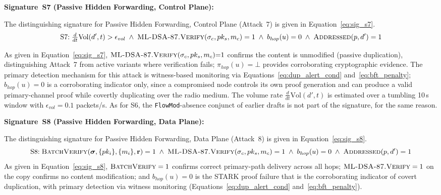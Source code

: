 \documentclass[12pt, a4paper]{report}
\begin{document}

\textbf{Signature~S7 (Passive Hidden Forwarding, Control Plane):}

The distinguishing signature for Passive Hidden
Forwarding, Control Plane (Attack~7) is given in
Equation~\eqref{eq:sig_s7}.
\begin{equation}
\text{S7:}\;
\tfrac{d}{dt}\text{Vol}(d',t) > \epsilon_{vol}
\;\land\; \textsc{ML-DSA-87.Verify}(
\sigma_c, pk_s, m_c) = 1
\;\land\; b_{hop}(u) = 0
\;\land\; \textsc{Addressed}(p, d') = 1
\label{eq:sig_s7}
\end{equation}

As given in Equation~\eqref{eq:sig_s7},
$\textsc{ML-DSA-87.Verify}(\sigma_c, pk_s, m_c){=}1$
confirms the content is unmodified (passive duplication),
distinguishing Attack~7 from active variants where
verification fails; $\pi_{hop}(u){=}\bot$ provides
corroborating cryptographic evidence. The primary
detection mechanism for this attack is witness-based
monitoring via Equations~\eqref{eq:dup_alert_cond}
and~\eqref{eq:bft_penalty}; $b_{hop}(u){=}0$ is a
corroborating indicator only, since a compromised node
controls its own proof generation and can produce a
valid primary-channel proof while covertly duplicating
over the radio medium.
The volume rate $\tfrac{d}{dt}\text{Vol}(d',t)$ is
estimated over a tumbling 10\,s window with
$\epsilon_{vol}=0.1$ packets/s. As for S6, the
\texttt{FlowMod}-absence conjunct of earlier drafts is
not part of the signature, for the same reason.




\textbf{Signature~S8 (Passive Hidden Forwarding, Data Plane):}


The distinguishing signature for Passive Hidden
Forwarding, Data Plane (Attack~8) is given in
Equation~\eqref{eq:sig_s8}.
\begin{equation}
\text{S8:}\;
\textsc{BatchVerify}(\boldsymbol{\sigma},
\{pk_i\}, \{m_i\}, \mathbf{r}) = 1
\;\land\; \textsc{ML-DSA-87.Verify}(
\sigma_c, pk_s, m_c) = 1
\;\land\; b_{hop}(u) = 0
\;\land\; \textsc{Addressed}(p, d') = 1
\label{eq:sig_s8}
\end{equation}
As given in Equation~\eqref{eq:sig_s8},
$\textsc{BatchVerify} = 1$ confirms correct
primary-path delivery across all hops;
$\textsc{ML-DSA-87.Verify} = 1$ on the copy
confirms no content modification; and
$b_{hop}(u) = 0$ is the \ac{STARK} proof failure
that is the corroborating indicator of covert
duplication, with primary detection via witness
monitoring (Equations~\eqref{eq:dup_alert_cond}
and~\eqref{eq:bft_penalty}).
\end{document}

